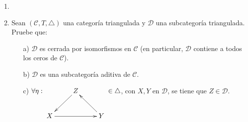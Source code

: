 \documentclass{article}
\newcommand{\cc}{\mathscr{C}}
\begin{document}
\begin{enumerate}
\begin{proof}
después de rotar ambos triángulos una vez a la izquierda (por 1.3) y aplicar el funtor cohomol\'ogico $Hom_{\cc}(X,\_):\cc \to ab$ se tiene el siguiente par de sucesiones exactas:

\begin{center}
\end{center} 
se puede deducir que $Hom_{\cc}(X,a)$ es un monomorfismo, así pues se cumple lo siguiente:

\begin{align*}
(Hom_{\cc}(X,a)\circ Hom_{\cc}(X,f))(1_{X}) =& (Hom_{\cc}(X,a)\circ Hom_{\cc}(X,f'))(1_{X})\\
Hom_{\cc}(X,a)(f) =& Hom_{\cc}(X,a)(f')\\
f =& f'
\end{align*}

como se buscaba. Para finalizar se estudia la unicidad del morfismo $h:Z\to C$.

\bigskip

Suponga pues que existe $h':Z\to C$ tal que $bg=h'v$. Considere el funtor covariante $Hom_{\cc}(X,\_):\cc \to Ab$ y observe que 


\end{proof}

\item
\item Sean $(\mathscr{C},T,\triangle)$ una categoría triangulada y $\mathscr{D}$ una subcategoría triangulada. Pruebe que:
\begin{itemize}
\item[a)] $\mathscr{D}$ es cerrada por isomorfismos en $\mathscr{C}$ (en particular, $\mathscr{D}$ contiene a todos los ceros de $\mathscr{C}$).

\item[b)] $\mathscr{D}$ es una subcategoría aditiva de  $\mathscr{C}$.

\item[c)] $\forall \eta:\xymatrix{&Z\ar[ld]&\\ X\ar[rr] & &Y\ar[ul]}\in \triangle $, con $X,Y$ en $\mathscr{D}$, se tiene que $Z\in \mathscr{D}$.


\end{itemize}
\end{enumerate}
\end{document}
